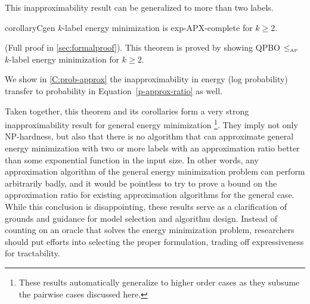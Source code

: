 This inapproximability result can be generalized to more than two labels.
\begin{restatable}{corollary}{Cgen}\label{C:gen}
$k$-label energy minimization is exp-APX-complete for $k \geq 2$.
\end{restatable}
%
\begin{proofsketch}
(Full proof in \cref{sec:formalproof}). This theorem is proved by showing QPBO $ \mathbin{{\leq}_{\text{\tiny AP}}}$ $k$-label energy minimization for $k \geq 2$.
\end{proofsketch}
We show in \cref{C:prob-approx} the inapproximability in energy (log probability) transfer to probability in Equation~\cref{p-approx-ratio} as well.

Taken together, this theorem and its corollaries form a very strong inapproximability result for general energy minimization \footnote{These results automatically generalize to higher order cases as they subsume the pairwise cases discussed here.}. They imply not only NP-hardness, but also that there is no algorithm that can approximate general energy minimization with two or more labels with an approximation ratio better than some exponential function in the input size. In other words, any approximation algorithm of the general energy minimization problem can perform arbitrarily badly, and it would be pointless to try to prove a bound on the approximation ratio for existing approximation algorithms for the general case.  While this conclusion is disappointing, these results serve as a clarification of grounds and guidance for model selection and algorithm design. Instead of counting on an oracle that solves the energy minimization problem, researchers should put efforts into selecting the proper formulation, trading off expressiveness for tractability.

 

